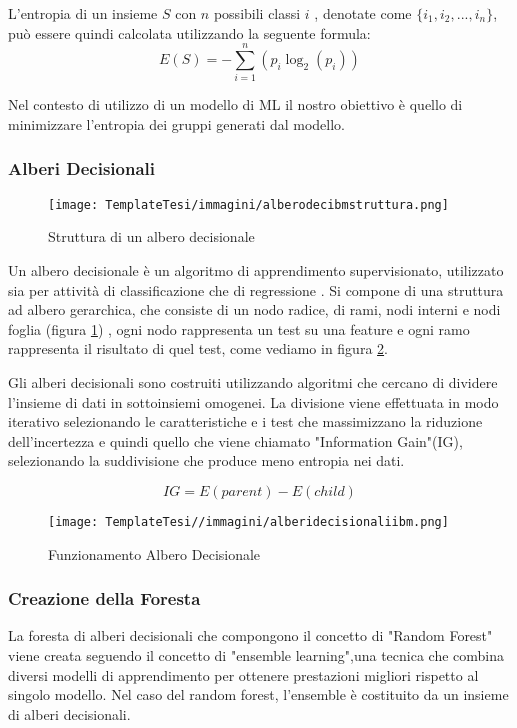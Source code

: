 \begin{flushleft}
L'entropia di un insieme $S$ con $n$ possibili classi $i$ , denotate come \(\{i_1, i_2, ..., i_n\}\), può essere quindi calcolata utilizzando la seguente formula:
$$E(S) = -\sum_{i=1}^{n} (p_i \log_2(p_i))$$

Nel contesto di utilizzo di un modello di ML il nostro obiettivo è quello di minimizzare l'entropia dei gruppi generati dal modello.

\subsubsection{Alberi Decisionali}
\begin{figure}[H]
    \centering
    \texttt{[image: TemplateTesi/immagini/alberodecibmstruttura.png]}
    \caption{Struttura di un albero decisionale \cite{ibmdecisiontrees}}
    \label{fig:ibmtrees_struttura}
\end{figure}
Un albero decisionale è un algoritmo di apprendimento supervisionato, utilizzato sia per attività di classificazione che di regressione \cite{ibmdecisiontrees}. Si compone di una struttura ad albero gerarchica, che consiste di un nodo radice, di rami, nodi interni e nodi foglia (figura \ref{fig:ibmtrees_struttura}) , ogni nodo rappresenta un test su una feature e ogni ramo rappresenta il risultato di quel test, come vediamo in figura \ref{fig:ibmtrees}.

Gli alberi decisionali sono costruiti utilizzando algoritmi che cercano di dividere l'insieme di dati in sottoinsiemi omogenei. La divisione viene effettuata in modo iterativo selezionando le caratteristiche e i test che massimizzano la riduzione dell'incertezza e quindi quello che viene chiamato "Information Gain"(IG), selezionando la suddivisione che produce meno entropia nei dati.

$$IG = E(parent) - E(child)$$

\begin{figure}[H]
    \centering
    \texttt{[image: TemplateTesi//immagini/alberidecisionaliibm.png]}
    \caption{Funzionamento Albero Decisionale \cite{ibmdecisiontrees}}
    \label{fig:ibmtrees}
\end{figure}

\subsubsection{Creazione della Foresta}
La foresta di alberi decisionali che compongono il concetto di "Random Forest" viene creata seguendo il concetto di "ensemble learning",una tecnica che combina diversi modelli di apprendimento per ottenere prestazioni migliori rispetto al singolo modello. Nel
caso del random forest, l'ensemble è costituito da un insieme di alberi decisionali.


\end{flushleft}
